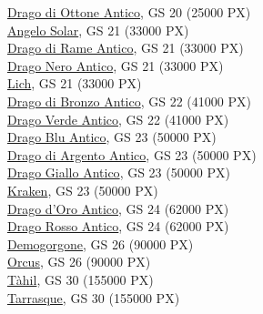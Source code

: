 \begin{multicols}{3}
{\hyperlink{Drago di Ottone Antico}{Drago di Ottone Antico}, GS 20 (25000 PX)\\
\hyperlink{Angelo Solar}{Angelo Solar}, GS 21 (33000 PX)\\
\hyperlink{Drago di Rame Antico}{Drago di Rame Antico}, GS 21 (33000 PX)\\
\hyperlink{Drago Nero Antico}{Drago Nero Antico}, GS 21 (33000 PX)\\
\hyperlink{Lich}{Lich}, GS 21 (33000 PX)\\
\hyperlink{Drago di Bronzo Antico}{Drago di Bronzo Antico}, GS 22 (41000 PX)\\
\hyperlink{Drago Verde Antico}{Drago Verde Antico}, GS 22 (41000 PX)\\
\hyperlink{Drago Blu Antico}{Drago Blu Antico}, GS 23 (50000 PX)\\
\hyperlink{Drago di Argento Antico}{Drago di Argento Antico}, GS 23 (50000 PX)\\
\hyperlink{Drago Giallo Antico}{Drago Giallo Antico}, GS 23 (50000 PX)\\
\hyperlink{Kraken}{Kraken}, GS 23 (50000 PX)\\
\hyperlink{Drago d'Oro Antico}{Drago d'Oro Antico}, GS 24 (62000 PX)\\
\hyperlink{Drago Rosso Antico}{Drago Rosso Antico}, GS 24 (62000 PX)\\
\hyperlink{Demogorgone}{Demogorgone}, GS 26 (90000 PX)\\
\hyperlink{Orcus}{Orcus}, GS 26 (90000 PX)\\
\hyperlink{Tàhil}{Tàhil}, GS 30 (155000 PX)\\
\hyperlink{Tarrasque}{Tarrasque}, GS 30 (155000 PX)\\

}

\end{multicols}

\pagebreak
